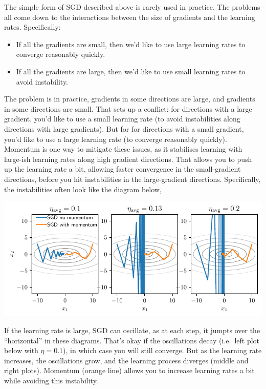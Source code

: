 \documentclass{article}
\newcommand{\0}{\mathbf{0}}
\begin{document}
The simple form of SGD described above is rarely used in practice.
The problems all come down to the interactions between the size of gradients and the learning rates.
Specifically:
\begin{itemize}
  \item If all the gradients are small, then we'd like to use large learning rates to converge reasonably quickly.
  \item If all the gradients are large, then we'd like to use small learning rates to avoid instability.
\end{itemize}
The problem is in practice, gradients in some directions are large, and gradients in some directions are small.
That sets up a conflict: for directions with a large gradient, you'd like to use a small learning rate (to avoid instabilities along directions with large gradients).
But for for directions with a small gradient, you'd like to use a large learning rate (to converge reasonably quickly).
Momentum is one way to mitigate these issues, as it stabilises learning with large-ish learning rates along high gradient directions.
That allows you to push up the learning rate a bit, allowing faster convergence in the small-gradient directions, before you hit instabilities in the large-gradient directions.
Specifically, the instabilities often look like the diagram below,
\begin{center}
  \includegraphics[width=\textwidth]{momentum.pdf}
\end{center}
If the learning rate is large, SGD can oscillate, as at each step, it jumpts over the ``horizontal'' in these diagrams.
That's okay if the oscillations decay (i.e.\ left plot below with $\eta=0.1$), in which case you will still converge.
But as the learning rate increases, the oscillations grow, and the learning process diverges (middle and right plots).
Momentum (orange line) allows you to increase learning rates a bit while avoiding this instability.
\end{document}
